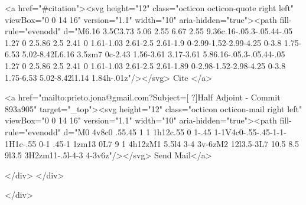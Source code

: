       <a  href="#citation"><svg height="12" class="octicon octicon-quote right left" viewBox="0 0 14 16" version="1.1" width="10" aria-hidden="true"><path fill-rule="evenodd" d="M6.16 3.5C3.73 5.06 2.55 6.67 2.55 9.36c.16-.05.3-.05.44-.05 1.27 0 2.5.86 2.5 2.41 0 1.61-1.03 2.61-2.5 2.61-1.9 0-2.99-1.52-2.99-4.25 0-3.8 1.75-6.53 5.02-8.42L6.16 3.5zm7 0c-2.43 1.56-3.61 3.17-3.61 5.86.16-.05.3-.05.44-.05 1.27 0 2.5.86 2.5 2.41 0 1.61-1.03 2.61-2.5 2.61-1.89 0-2.98-1.52-2.98-4.25 0-3.8 1.75-6.53 5.02-8.42l1.14 1.84h-.01z"/></svg> Cite
      </a>

      <a href="mailto:prieto.jona@gmail.com?Subject=[ ?]Half Adjoint - Commit 893a905" target="_top"><svg height="12" class="octicon octicon-mail right left" viewBox="0 0 14 16" version="1.1" width="10" aria-hidden="true"><path fill-rule="evenodd" d="M0 4v8c0 .55.45 1 1 1h12c.55 0 1-.45 1-1V4c0-.55-.45-1-1-1H1c-.55 0-1 .45-1 1zm13 0L7 9 1 4h12zM1 5.5l4 3-4 3v-6zM2 12l3.5-3L7 10.5 8.5 9l3.5 3H2zm11-.5l-4-3 4-3v6z"/></svg> Send Mail</a>

    </div>
  </div>

</div>




